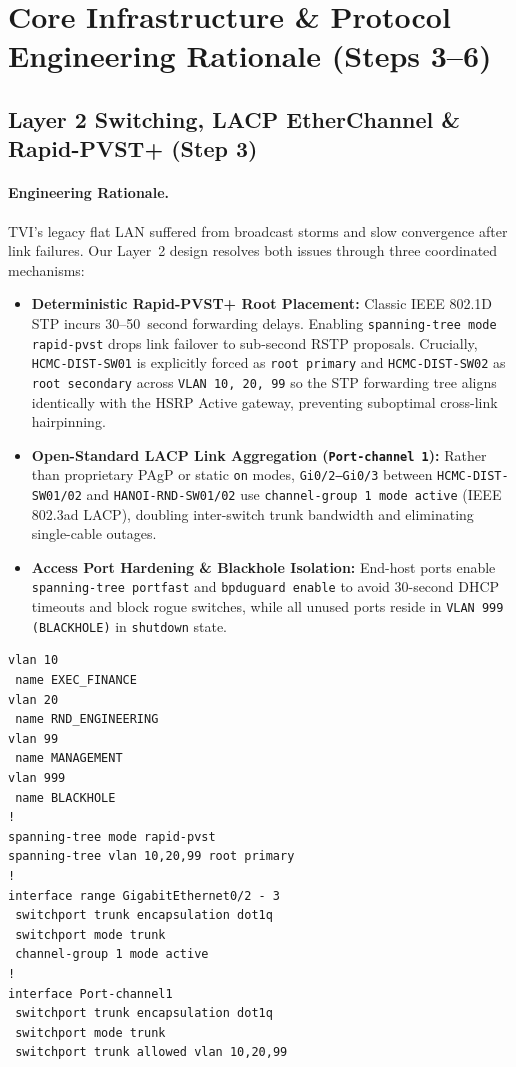 \section{Core Infrastructure \& Protocol Engineering Rationale (Steps 3--6)}

\subsection{Layer 2 Switching, LACP EtherChannel \& Rapid-PVST+ (Step 3)}
\paragraph{Engineering Rationale.}
TVI's legacy flat LAN suffered from broadcast storms and slow convergence after link failures. Our Layer~2 design resolves both issues through three coordinated mechanisms:
\begin{itemize}[leftmargin=1.5em, itemsep=2pt]
    \item \textbf{Deterministic Rapid-PVST+ Root Placement:} Classic IEEE 802.1D STP incurs 30--50~second forwarding delays. Enabling \texttt{spanning-tree mode rapid-pvst} drops link failover to sub-second RSTP proposals. Crucially, \texttt{HCMC-DIST-SW01} is explicitly forced as \texttt{root primary} and \texttt{HCMC-DIST-SW02} as \texttt{root secondary} across \texttt{VLAN 10, 20, 99} so the STP forwarding tree aligns identically with the HSRP Active gateway, preventing suboptimal cross-link hairpinning.
    \item \textbf{Open-Standard LACP Link Aggregation (\texttt{Port-channel 1}):} Rather than proprietary PAgP or static \texttt{on} modes, \texttt{Gi0/2--Gi0/3} between \texttt{HCMC-DIST-SW01/02} and \texttt{HANOI-RND-SW01/02} use \texttt{channel-group 1 mode active} (IEEE 802.3ad LACP), doubling inter-switch trunk bandwidth and eliminating single-cable outages.
    \item \textbf{Access Port Hardening \& Blackhole Isolation:} End-host ports enable \texttt{spanning-tree portfast} and \texttt{bpduguard enable} to avoid 30-second DHCP timeouts and block rogue switches, while all unused ports reside in \texttt{VLAN 999 (BLACKHOLE)} in \texttt{shutdown} state.
\end{itemize}

\begin{lstlisting}[style=CiscoCLI, caption={Reference Layer 2 Trunking, LACP, and Rapid-PVST+ Baseline (HQ Distribution SW01).}]
vlan 10
 name EXEC_FINANCE
vlan 20
 name RND_ENGINEERING
vlan 99
 name MANAGEMENT
vlan 999
 name BLACKHOLE
!
spanning-tree mode rapid-pvst
spanning-tree vlan 10,20,99 root primary
!
interface range GigabitEthernet0/2 - 3
 switchport trunk encapsulation dot1q
 switchport mode trunk
 channel-group 1 mode active
!
interface Port-channel1
 switchport trunk encapsulation dot1q
 switchport mode trunk
 switchport trunk allowed vlan 10,20,99
\end{lstlisting}

